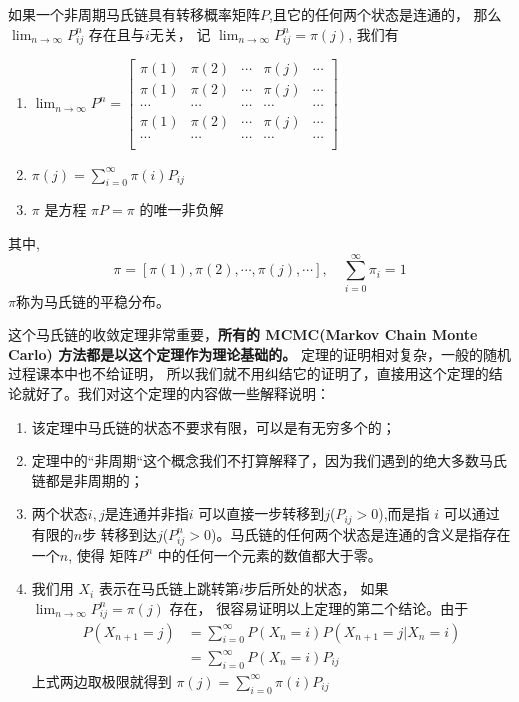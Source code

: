 \begin{theorem} 如果一个非周期马氏链具有转移概率矩阵$P$,且它的任何两个状态是连通的，
那么 $\displaystyle \lim_{n\rightarrow\infty}P_{ij}^n$ 存在且与$i$无关，
记 $\displaystyle \lim_{n\rightarrow\infty}P_{ij}^n = \pi(j)$, 我们有
\begin{enumerate}
\item $ \displaystyle \lim_{n \rightarrow \infty} P^n =
\begin{bmatrix}
\pi(1) & \pi(2) & \cdots & \pi(j) & \cdots \\
\pi(1) & \pi(2) & \cdots & \pi(j) & \cdots \\
\cdots & \cdots & \cdots & \cdots & \cdots \\
\pi(1) & \pi(2) & \cdots & \pi(j) & \cdots \\
\cdots & \cdots & \cdots & \cdots & \cdots \\
\end{bmatrix} $
\item $ \displaystyle \pi(j) = \sum_{i=0}^{\infty}\pi(i)P_{ij} $
\item $\pi$ 是方程 $\pi P = \pi$ 的唯一非负解
\end{enumerate}
其中,
$$ \pi = [\pi(1), \pi(2), \cdots, \pi(j),\cdots ], \quad \sum_{i=0}^{\infty} \pi_i = 1  $$
$\pi$称为马氏链的平稳分布。
\end{theorem}


这个马氏链的收敛定理非常重要，\textbf{所有的 MCMC(Markov Chain Monte Carlo)
方法都是以这个定理作为理论基础的。}
定理的证明相对复杂，一般的随机过程课本中也不给证明，
所以我们就不用纠结它的证明了，直接用这个定理的结论就好了。我们对这个定理的内容做一些解释说明：
\begin{enumerate}
\item 该定理中马氏链的状态不要求有限，可以是有无穷多个的；
\item 定理中的“非周期“这个概念我们不打算解释了，因为我们遇到的绝大多数马氏链都是非周期的；
\item 两个状态$i,j$是连通并非指$i$ 可以直接一步转移到$j$($P_{ij} > 0$),而是指 $i$ 可以通过有限的$n$步
转移到达$j$($P_{ij}^n > 0$)。马氏链的任何两个状态是连通的含义是指存在一个$n$, 使得
矩阵$P^n$ 中的任何一个元素的数值都大于零。
\item 我们用 $X_i$ 表示在马氏链上跳转第$i$步后所处的状态，
如果 $\displaystyle \lim_{n\rightarrow\infty}P_{ij}^n = \pi(j)$ 存在，
很容易证明以上定理的第二个结论。由于
\begin{align*}
P(X_{n+1}=j) & = \sum_{i=0}^\infty P(X_n=i) P(X_{n+1}=j|X_n=i) \\
& = \sum_{i=0}^\infty P(X_n=i) P_{ij}
\end{align*}
上式两边取极限就得到 $ \displaystyle \pi(j) = \sum_{i=0}^{\infty}\pi(i)P_{ij}$
\end{enumerate}

